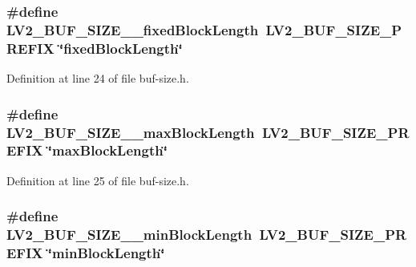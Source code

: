 \subsubsection[{\texorpdfstring{L\+V2\+\_\+\+B\+U\+F\+\_\+\+S\+I\+Z\+E\+\_\+\+\_\+fixed\+Block\+Length}{LV2_BUF_SIZE__fixedBlockLength}}]{\setlength{\rightskip}{0pt plus 5cm}\#define L\+V2\+\_\+\+B\+U\+F\+\_\+\+S\+I\+Z\+E\+\_\+\+\_\+fixed\+Block\+Length~{\bf L\+V2\+\_\+\+B\+U\+F\+\_\+\+S\+I\+Z\+E\+\_\+\+P\+R\+E\+F\+IX} \char`\"{}fixed\+Block\+Length\char`\"{}}\hypertarget{buf-size_8h_a059909f9e27431fae22d2cfeb7029919}{}\label{buf-size_8h_a059909f9e27431fae22d2cfeb7029919}


Definition at line 24 of file buf-\/size.\+h.

\subsubsection[{\texorpdfstring{L\+V2\+\_\+\+B\+U\+F\+\_\+\+S\+I\+Z\+E\+\_\+\+\_\+max\+Block\+Length}{LV2_BUF_SIZE__maxBlockLength}}]{\setlength{\rightskip}{0pt plus 5cm}\#define L\+V2\+\_\+\+B\+U\+F\+\_\+\+S\+I\+Z\+E\+\_\+\+\_\+max\+Block\+Length~{\bf L\+V2\+\_\+\+B\+U\+F\+\_\+\+S\+I\+Z\+E\+\_\+\+P\+R\+E\+F\+IX} \char`\"{}max\+Block\+Length\char`\"{}}\hypertarget{buf-size_8h_abe5cfaa4a0ac9fc7f6963fac7fd2d1a2}{}\label{buf-size_8h_abe5cfaa4a0ac9fc7f6963fac7fd2d1a2}


Definition at line 25 of file buf-\/size.\+h.

\subsubsection[{\texorpdfstring{L\+V2\+\_\+\+B\+U\+F\+\_\+\+S\+I\+Z\+E\+\_\+\+\_\+min\+Block\+Length}{LV2_BUF_SIZE__minBlockLength}}]{\setlength{\rightskip}{0pt plus 5cm}\#define L\+V2\+\_\+\+B\+U\+F\+\_\+\+S\+I\+Z\+E\+\_\+\+\_\+min\+Block\+Length~{\bf L\+V2\+\_\+\+B\+U\+F\+\_\+\+S\+I\+Z\+E\+\_\+\+P\+R\+E\+F\+IX} \char`\"{}min\+Block\+Length\char`\"{}}\hypertarget{buf-size_8h_a170e1a5208885aa99adb92bec93631c2}{}\label{buf-size_8h_a170e1a5208885aa99adb92bec93631c2}



